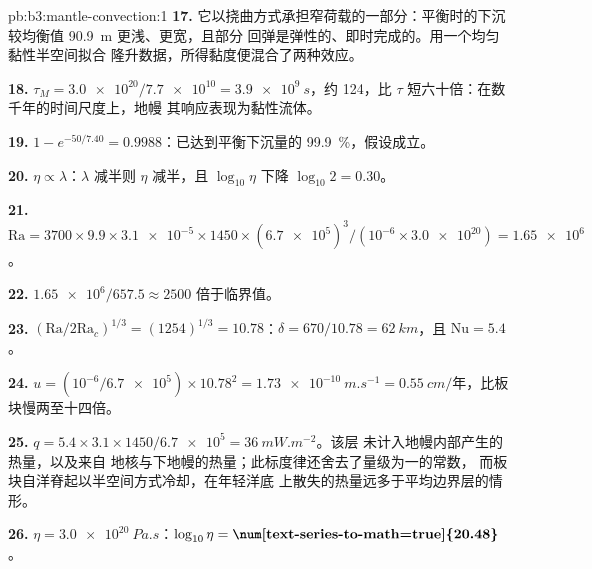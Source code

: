 \begin{solution}{pb:b3:mantle-convection:1}
\textbf{17.} 它以挠曲方式承担窄荷载的一部分：平衡时的下沉
较均衡值 \qty{90.9}{m} 更浅、更宽，且部分
回弹是弹性的、即时完成的。用一个均匀黏性半空间拟合
隆升数据，所得黏度便混合了两种效应。

\textbf{18.} $\tau_M = \num{3.0e20}/\num{7.7e10} = \qty{3.9e9}{s}$，约
\qty{124}{}，比 $\tau$ 短六十倍：在数千年的时间尺度上，地幔
其响应表现为黏性流体。

\textbf{19.} $1 - e^{-50/7.40} = 0.9988$：已达到平衡下沉量的
\qty{99.9}{\percent}，假设成立。

\textbf{20.} $\eta \propto \lambda$：$\lambda$ 减半则 $\eta$ 减半，且
$\log_{10}\eta$ 下降 $\log_{10}2 = 0.30$。

\textbf{21.} $\mathrm{Ra} = 3700\times9.9\times\num{3.1e-5}\times1450\times
(\num{6.7e5})^3/(10^{-6}\times\num{3.0e20}) = \num{1.65e6}$。

\textbf{22.} $\num{1.65e6}/657.5 \approx 2500$ 倍于临界值。

\textbf{23.} $(\mathrm{Ra}/2\mathrm{Ra}_c)^{1/3} = (1254)^{1/3} = 10.78$：$\delta
= 670/10.78 = \qty{62}{km}$，且 $\mathrm{Nu} = 5.4$。

\textbf{24.} $u = (10^{-6}/\num{6.7e5})\times10.78^2 = \qty{1.73e-10}{m.s^{-1}}
= \qty{0.55}{cm/\text{年}}$，比板块慢两至十四倍。

\textbf{25.} $q = 5.4\times3.1\times1450/\num{6.7e5} = \qty{36}{mW.m^{-2}}$。该层
未计入地幔内部产生的热量，以及来自
地核与下地幔的热量；此标度律还舍去了量级为一的常数，
而板块自洋脊起以半空间方式冷却，在年轻洋底
上散失的热量远多于平均边界层的情形。

\textbf{26.} $\eta = \qty{3.0e20}{Pa.s}$：$\log_{10}\eta =
\textbf{\num[text-series-to-math=true]{20.48}}$。
\end{solution}
